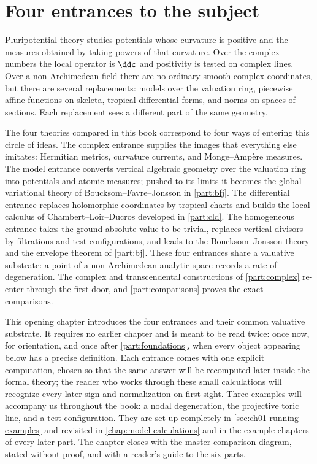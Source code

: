 \chapter{Four entrances to the subject}
\label{chap:four-entrances}

Pluripotential theory studies potentials whose curvature is positive and the
measures obtained by taking powers of that curvature.  Over the complex
numbers the local operator is $\ddc$ and positivity is tested on complex
lines.  Over a non-Archimedean field there are no ordinary smooth complex
coordinates, but there are several replacements: models over the valuation
ring, piecewise affine functions on skeleta, tropical differential forms, and
norms on spaces of sections.  Each replacement sees a different part of the
same geometry.

The four theories compared in this book correspond to four ways of entering
this circle of ideas.  The complex entrance supplies the images that
everything else imitates: Hermitian metrics, curvature currents, and
Monge--Amp\`ere measures.  The model entrance converts vertical algebraic
geometry over the valuation ring into potentials and atomic measures; pushed
to its limits it becomes the global variational theory of
Boucksom--Favre--Jonsson in \cref{part:bfj}.  The differential entrance
replaces holomorphic coordinates by tropical charts and builds the local
calculus of Chambert--Loir--Ducros developed in \cref{part:cld}.  The
homogeneous entrance takes the ground absolute value to be trivial, replaces
vertical divisors by filtrations and test configurations, and leads to the
Boucksom--Jonsson theory and the envelope theorem of \cref{part:bj}.  These
four entrances share a valuative substrate: a point of a non-Archimedean
analytic space records a rate of degeneration.  The complex and
transcendental constructions of \cref{part:complex} re-enter through the
first door, and \cref{part:comparisons} proves the exact comparisons.

This opening chapter introduces the four entrances and their common valuative
substrate.  It requires no earlier chapter and is meant to be read twice:
once now, for
orientation, and once after \cref{part:foundations}, when every object appearing below has a
precise definition.  Each entrance comes with one explicit computation,
chosen so that the same answer will be recomputed later inside the formal
theory; the reader who works through these small calculations will recognize
every later sign and normalization on first sight.  Three examples will
accompany us throughout the book:
a nodal degeneration, the projective toric line, and a test configuration.
They are set up completely in \cref{sec:ch01-running-examples} and revisited
in \cref{chap:model-calculations} and in the example chapters of every later
part.  The chapter closes with the master comparison diagram, stated without
proof, and with a reader's guide to the six parts.

